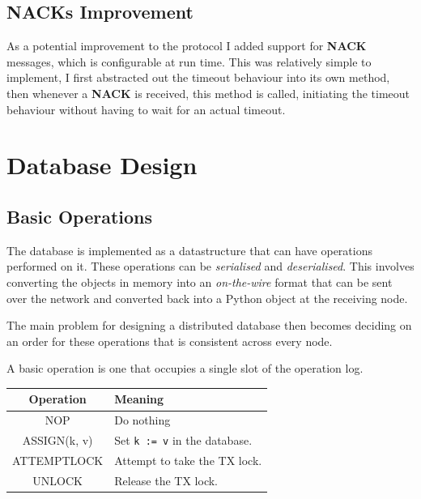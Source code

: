 \documentclass[12pt,twoside,notitlepage]{report}
\newcommand{\msg}[1] {{\bf #1}}         %
\begin{document}

\subsection{NACKs Improvement}

As a potential improvement to the protocol I added support for \msg{NACK} messages, which is
configurable at run time. This was relatively simple to implement, I first abstracted out the
timeout behaviour into its own method, then whenever a \msg{NACK} is received, this method is
called, initiating the timeout behaviour without having to wait for an actual timeout.

\section{Database Design}

\subsection{Basic Operations}

The database is implemented as a datastructure that can have operations performed on it. These
operations can be \emph{serialised} and \emph{deserialised}. This involves converting the objects
in memory into an \emph{on-the-wire} format that can be sent over the network and converted back
into a Python object at the receiving node.

The main problem for designing a distributed database then becomes deciding on an order for these
operations that is consistent across every node.

A basic operation is one that occupies a single slot of the operation log.


\begin{tabular}{ | c | p{7cm} | }
  \hline
  {\bf Operation} & {\bf Meaning} \\ \hline
  NOP & Do nothing \\ \hline
  ASSIGN(k, v) & Set \verb+k := v+ in the database. \\ \hline
  ATTEMPTLOCK & Attempt to take the TX lock. \\ \hline
  UNLOCK & Release the TX lock. \\ \hline
\end{tabular}
\end{document}
